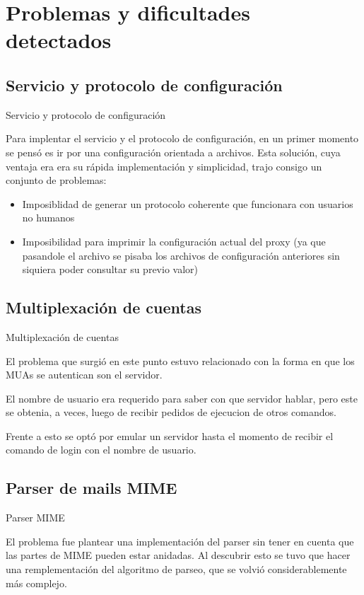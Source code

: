 \documentclass{beamer}
\begin{document}

\section{Problemas y dificultades detectados}
\subsection{Servicio y protocolo de configuración}
\begin{frame}{Servicio y protocolo de configuración}
\par Para implentar el servicio y el protocolo de configuración, en un primer momento se pensó es ir por una configuración orientada a archivos. Esta solución, cuya ventaja era era su rápida implementación y simplicidad, trajo consigo un conjunto de problemas:\\
\begin{itemize}
\item Imposiblidad de generar un protocolo coherente que funcionara con usuarios no humanos
\item Imposibilidad para imprimir la configuración actual del proxy (ya que pasandole el archivo se pisaba los archivos de configuración anteriores sin siquiera poder consultar su previo valor)
\end{itemize}
\end{frame}

\subsection{Multiplexación de cuentas}
\begin{frame}{Multiplexación de cuentas}
\par El problema que surgió en este punto estuvo relacionado con la forma en que los MUAs se autentican son el servidor. \\[0.5cm]
\par El nombre de usuario era requerido para saber con que servidor hablar, pero este se obtenia, a veces, luego de recibir pedidos de ejecucion de otros comandos.
\par Frente a esto se optó por emular un servidor hasta el momento de recibir el comando de login con el nombre de usuario.
\end{frame}

\subsection{Parser de mails MIME}
\begin{frame}{Parser MIME}
\par El problema fue plantear una implementación del parser sin tener en cuenta que las partes de MIME pueden estar anidadas. Al descubrir esto se tuvo que hacer una remplementación del algoritmo de parseo, que se volvió considerablemente más complejo.
\end{frame}
\end{document}
